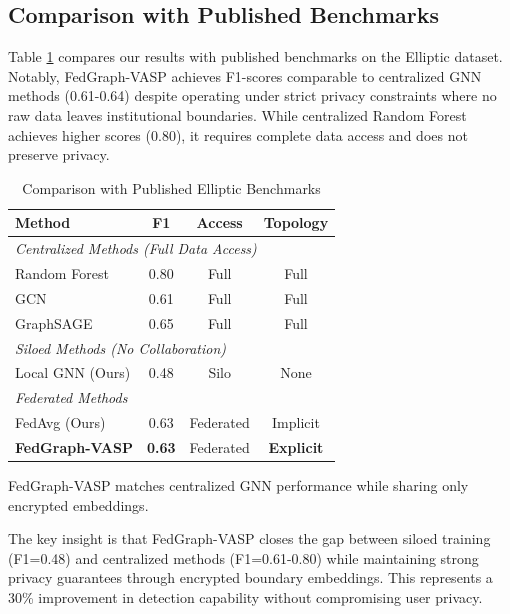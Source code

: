 \documentclass[conference]{IEEEtran}
\begin{document}
\subsection{Comparison with Published Benchmarks}

Table \ref{tab:benchmarks} compares our results with published benchmarks on the Elliptic dataset. Notably, FedGraph-VASP achieves F1-scores comparable to centralized GNN methods (0.61-0.64) despite operating under strict privacy constraints where no raw data leaves institutional boundaries. While centralized Random Forest achieves higher scores (0.80), it requires complete data access and does not preserve privacy.

\begin{table}[htbp]
\caption{Comparison with Published Elliptic Benchmarks}
\begin{center}
\begin{tabular}{lccc}
\toprule
\textbf{Method} & \textbf{F1} & \textbf{Access} & \textbf{Topology} \\
\midrule
\multicolumn{4}{l}{\textit{Centralized Methods (Full Data Access)}} \\
Random Forest \cite{weber2019anti} & 0.80 & Full & Full \\
GCN \cite{weber2019anti} & 0.61 & Full & Full \\
GraphSAGE \cite{hamilton2017inductive} & 0.65 & Full & Full \\
\midrule
\multicolumn{4}{l}{\textit{Siloed Methods (No Collaboration)}} \\
Local GNN (Ours) & 0.48 & Silo & None \\
\midrule
\multicolumn{4}{l}{\textit{Federated Methods}} \\
FedAvg (Ours) & 0.63 & Federated & Implicit \\
\textbf{FedGraph-VASP} & \textbf{0.63} & Federated & \textbf{Explicit} \\
\bottomrule
\end{tabular}
\label{tab:benchmarks}
\end{center}
\vspace{-0.2cm}
\footnotesize{FedGraph-VASP matches centralized GNN performance while sharing only encrypted embeddings.}
\end{table}

The key insight is that FedGraph-VASP closes the gap between siloed training (F1=0.48) and centralized methods (F1=0.61-0.80) while maintaining strong privacy guarantees through encrypted boundary embeddings. This represents a 30\% improvement in detection capability without compromising user privacy.
\end{document}
